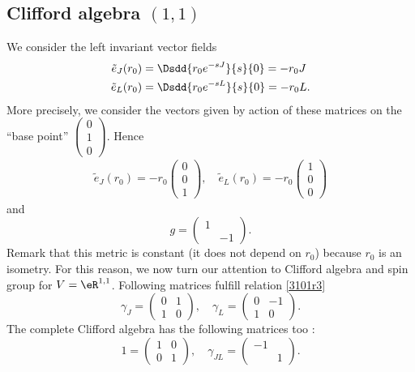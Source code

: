 \subsection{Clifford algebra \texorpdfstring{$(1,1)$}{(1,1)}}

We consider the left invariant vector fields
\begin{subequations}
\begin{align}
  \tilde{e}_J(r_0)&=\Dsdd{ r_0 e^{-sJ} }{s}{0}=-r_0J\\
\tilde{e}_L(r_0)&=\Dsdd{ r_0 e^{-sL} }{s}{0}=-r_0L.
\end{align}
\end{subequations}
More precisely, we consider the vectors given by action of these matrices on the ``base point'' $\begin{pmatrix}
0\\1\\0
\end{pmatrix}$. Hence
\begin{align}
\tilde{e}_J(r_0)=-r_0\begin{pmatrix}
0\\0\\1
\end{pmatrix},\quad
\tilde{e}_L(r_0)=-r_0\begin{pmatrix}
1\\0\\0
\end{pmatrix}
\end{align}
and 
\[ 
  g=\begin{pmatrix}
1\\&-1
\end{pmatrix}.
\]
Remark that this metric is constant (it does not depend on $r_0$) because $r_0$ is an isometry. For this reason, we now turn our attention to Clifford algebra and spin group for $V=\eR^{1,1}$. Following matrices fulfill relation \eqref{3101r3}
\[ 
  \gamma_J=\begin{pmatrix}
0&1\\1&0
\end{pmatrix},\quad
\gamma_L=\begin{pmatrix}
0&-1\\1&0
\end{pmatrix}. 
\]
The complete Clifford algebra has the following matrices too :
\[ 
  1=\begin{pmatrix}
1&0\\0&1
\end{pmatrix},\quad
\gamma_{JL}=\begin{pmatrix}
-1\\&1
\end{pmatrix}.
\]
